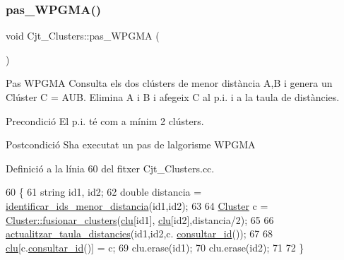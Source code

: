 \subsubsection{\texorpdfstring{pas\+\_\+\+W\+P\+G\+M\+A()}{pas\_WPGMA()}}
{\footnotesize\ttfamily void Cjt\+\_\+\+Clusters\+::pas\+\_\+\+W\+P\+G\+MA (\begin{DoxyParamCaption}{ }\end{DoxyParamCaption})}



Pas W\+P\+G\+MA Consulta els dos clústers de menor distància A,B i genera un Clúster C = A\+UB. Elimina A i B i afegeix C al p.\+i. i a la taula de distàncies. 

\begin{DoxyPrecond}{Precondició}
El p.\+i. té com a mínim 2 clústers. 
\end{DoxyPrecond}
\begin{DoxyPostcond}{Postcondició}
S\textquotesingle{}ha executat un pas de l\textquotesingle{}algorisme W\+P\+G\+MA 
\end{DoxyPostcond}


Definició a la línia 60 del fitxer Cjt\+\_\+\+Clusters.\+cc.


\begin{DoxyCode}
60                              \{
61     \textcolor{keywordtype}{string} id1, id2;
62     \textcolor{keywordtype}{double} distancia = \hyperlink{class_cjt___clusters_a3d2a5fe0c02b0b74d030447fc601e9f9}{identificar\_ids\_menor\_distancia}(id1,id2);
63     
64     \hyperlink{class_cluster}{Cluster} c = \hyperlink{class_cluster_a3b6ef4bede0ac20ae591db48c8976729}{Cluster::fusionar\_clusters}(\hyperlink{class_cjt___clusters_a86fd6089c4e49eaedea86d5ec4ee6495}{clu}[id1],
      \hyperlink{class_cjt___clusters_a86fd6089c4e49eaedea86d5ec4ee6495}{clu}[id2],distancia/2);
65 
66     \hyperlink{class_cjt___clusters_a15ac7653c39fe7ed1f2e21debeb3b24b}{actualitzar\_taula\_distancies}(id1,id2,c.
      \hyperlink{class_cluster_a040da4a393c7fcb8ac7edbe5b82679cf}{consultar\_id}());
67     
68     \hyperlink{class_cjt___clusters_a86fd6089c4e49eaedea86d5ec4ee6495}{clu}[c.\hyperlink{class_cluster_a040da4a393c7fcb8ac7edbe5b82679cf}{consultar\_id}()] = c;
69     clu.erase(id1);
70     clu.erase(id2);
71     
72 \}
\end{DoxyCode}
\mbox{\label{class_cjt___clusters_aa4de01f6c66018acd6ac04f9686f0a17}} 
